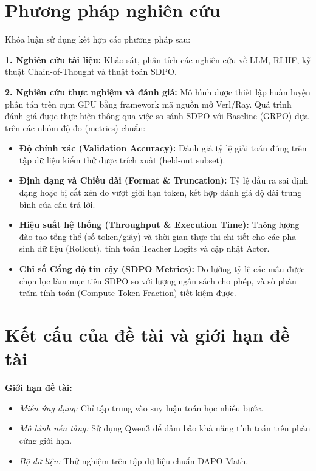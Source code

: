 \documentclass[12pt,a4paper]{report}
\begin{document}
\section{Phương pháp nghiên cứu}
Khóa luận sử dụng kết hợp các phương pháp sau:

\textbf{1. Nghiên cứu tài liệu:} Khảo sát, phân tích các nghiên cứu về LLM, RLHF, kỹ thuật Chain-of-Thought và thuật toán SDPO.

\textbf{2. Nghiên cứu thực nghiệm và đánh giá:} 
Mô hình được thiết lập huấn luyện phân tán trên cụm GPU bằng framework mã nguồn mở Verl/Ray. Quá trình đánh giá được thực hiện thông qua việc so sánh SDPO với Baseline (GRPO) dựa trên các nhóm độ đo (metrics) chuẩn:
\begin{itemize}
    \item \textbf{Độ chính xác (Validation Accuracy):} Đánh giá tỷ lệ giải toán đúng trên tập dữ liệu kiểm thử được trích xuất (held-out subset).
    \item \textbf{Định dạng và Chiều dài (Format \& Truncation):} Tỷ lệ đầu ra sai định dạng hoặc bị cắt xén do vượt giới hạn token, kết hợp đánh giá độ dài trung bình của câu trả lời.
    \item \textbf{Hiệu suất hệ thống (Throughput \& Execution Time):} Thông lượng đào tạo tổng thể (số token/giây) và thời gian thực thi chi tiết cho các pha sinh dữ liệu (Rollout), tính toán Teacher Logits và cập nhật Actor.
    \item \textbf{Chỉ số Cổng độ tin cậy (SDPO Metrics):} Đo lường tỷ lệ các mẫu được chọn lọc làm mục tiêu SDPO so với lượng ngân sách cho phép, và số phần trăm tính toán (Compute Token Fraction) tiết kiệm được.
\end{itemize}

\section{Kết cấu của đề tài và giới hạn đề tài}

\textbf{Giới hạn đề tài:} 
\begin{itemize}
    \item \textit{Miền ứng dụng:} Chỉ tập trung vào suy luận toán học nhiều bước.
    \item \textit{Mô hình nền tảng:} Sử dụng Qwen3 để đảm bảo khả năng tính toán trên phần cứng giới hạn.
    \item \textit{Bộ dữ liệu:} Thử nghiệm trên tập dữ liệu chuẩn DAPO-Math.
\end{itemize}
\end{document}
